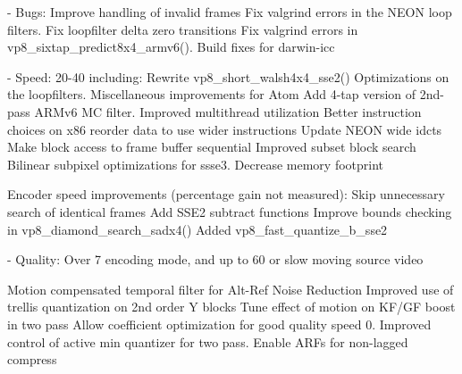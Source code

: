 \begin{DoxyVerbInclude}
  - Bugs:
      Improve handling of invalid frames
      Fix valgrind errors in the NEON loop filters.
      Fix loopfilter delta zero transitions
      Fix valgrind errors in vp8_sixtap_predict8x4_armv6().
      Build fixes for darwin-icc

  - Speed:
      20-40%
      including:
        Rewrite vp8_short_walsh4x4_sse2()
        Optimizations on the loopfilters.
        Miscellaneous improvements for Atom
        Add 4-tap version of 2nd-pass ARMv6 MC filter.
        Improved multithread utilization
        Better instruction choices on x86
        reorder data to use wider instructions
        Update NEON wide idcts
        Make block access to frame buffer sequential
        Improved subset block search
        Bilinear subpixel optimizations for ssse3.
        Decrease memory footprint

      Encoder speed improvements (percentage gain not measured):
        Skip unnecessary search of identical frames
        Add SSE2 subtract functions
        Improve bounds checking in vp8_diamond_search_sadx4()
        Added vp8_fast_quantize_b_sse2

  - Quality:
      Over 7%
      encoding mode, and up to 60%
      or slow moving source video

        Motion compensated temporal filter for Alt-Ref Noise Reduction
        Improved use of trellis quantization on 2nd order Y blocks
        Tune effect of motion on KF/GF boost in two pass
        Allow coefficient optimization for good quality speed 0.
        Improved control of active min quantizer for two pass.
        Enable ARFs for non-lagged compress


\end{DoxyVerbInclude}

